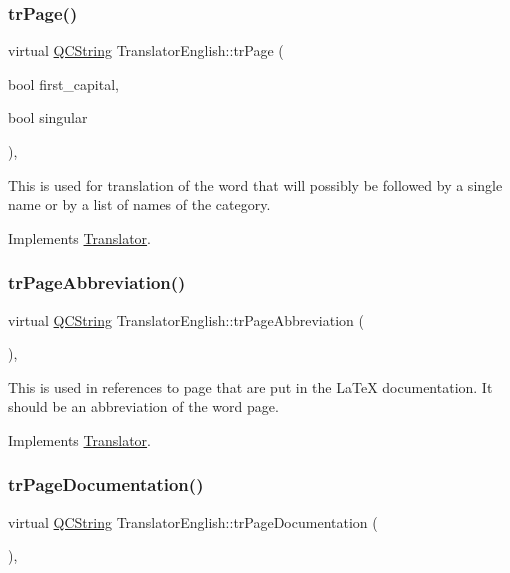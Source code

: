 \subsubsection{\texorpdfstring{trPage()}{trPage()}}
{\footnotesize\ttfamily virtual \mbox{\hyperlink{class_q_c_string}{Q\+C\+String}} Translator\+English\+::tr\+Page (\begin{DoxyParamCaption}\item[{bool}]{first\+\_\+capital,  }\item[{bool}]{singular }\end{DoxyParamCaption})\hspace{0.3cm}{\ttfamily [inline]}, {\ttfamily [virtual]}}

This is used for translation of the word that will possibly be followed by a single name or by a list of names of the category. 

Implements \mbox{\hyperlink{class_translator}{Translator}}.

\mbox{\label{class_translator_english_a35b72349c997135cea10e1db4a671353}} 
\subsubsection{\texorpdfstring{trPageAbbreviation()}{trPageAbbreviation()}}
{\footnotesize\ttfamily virtual \mbox{\hyperlink{class_q_c_string}{Q\+C\+String}} Translator\+English\+::tr\+Page\+Abbreviation (\begin{DoxyParamCaption}{ }\end{DoxyParamCaption})\hspace{0.3cm}{\ttfamily [inline]}, {\ttfamily [virtual]}}

This is used in references to page that are put in the La\+TeX documentation. It should be an abbreviation of the word page. 

Implements \mbox{\hyperlink{class_translator}{Translator}}.

\mbox{\label{class_translator_english_a2b4bdde37ed5b38e0c3cf82782c9bf53}} 
\subsubsection{\texorpdfstring{trPageDocumentation()}{trPageDocumentation()}}
{\footnotesize\ttfamily virtual \mbox{\hyperlink{class_q_c_string}{Q\+C\+String}} Translator\+English\+::tr\+Page\+Documentation (\begin{DoxyParamCaption}{ }\end{DoxyParamCaption})\hspace{0.3cm}{\ttfamily [inline]}, {\ttfamily [virtual]}}

